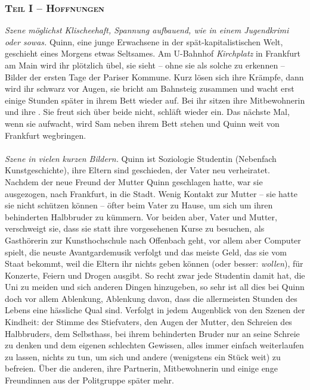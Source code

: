 \subsubsection{\textsc{Teil I -- Hoffnungen}}
\emph{Szene möglichst Klischeehaft, Spannung aufbauend, wie in einem
Jugendkrimi oder sowas.}
Quinn, eine  junge Erwachsene in der
spät-ka\-pi\-ta\-lis\-tischen Welt, geschieht eines Morgens etwas Seltsames.
Am U-Bahnhof \emph{Kirchplatz} in Frankfurt am Main wird ihr plötzlich übel, sie
sieht -- ohne sie als solche zu erkennen -- Bilder der ersten Tage der Pariser
Kommune. 
Kurz lösen sich ihre Krämpfe, dann wird ihr schwarz vor Augen, sie bricht am
Bahnsteig zusammen und wacht erst einige Stunden später in ihrem Bett wieder
auf. 
Bei ihr sitzen ihre Mitbewohnerin und ihre . 
Sie freut sich über beide nicht, schläft wieder ein.
Das nächste Mal, wenn sie aufwacht, wird Sam neben ihrem Bett stehen und Quinn
weit von Frankfurt wegbringen.\\\\
%
\emph{Szene in vielen kurzen Bildern.}
Quinn ist Soziologie Studentin (Nebenfach Kunstgeschichte), ihre Eltern sind
geschieden, der Vater neu verheiratet. 
Nachdem der neue Freund der Mutter Quinn geschlagen hatte, war sie ausgezogen,
nach Frankfurt, in die Stadt. 
Wenig Kontakt zur Mutter -- sie hatte sie nicht schützen können -- öfter beim
Vater zu Hause, um sich um ihren behinderten Halbbruder zu kümmern. 
Vor beiden aber, Vater und Mutter, verschweigt sie, dass sie statt ihre
vorgesehenen Kurse zu besuchen, als Gasthörerin zur Kunsthochschule nach
Offenbach geht, vor allem aber Computer spielt, die neuste Avantgardemusik
verfolgt und das meiste Geld, das sie vom Staat bekommt, weil
die Eltern ihr nichts geben können (oder besser: \emph{wollen}), für Konzerte,
Feiern und Drogen ausgibt. 
So recht zwar jede Studentin damit hat, die Uni zu meiden und sich anderen Dingen
hinzugeben, so sehr ist all dies bei Quinn doch vor allem Ablenkung, Ablenkung
davon, dass die allermeisten Stunden des Lebens eine hässliche Qual sind. 
Verfolgt in jedem Augenblick von den Szenen der Kindheit: der Stimme des
Stiefvaters, den Augen der Mutter, den Schreien des Halbbruders, dem Selbsthass,
bei ihrem behinderten Bruder nur an seine Schreie zu denken und dem eigenen
schlechten Gewissen, alles immer einfach weiterlaufen zu lassen, nichts zu tun,
um sich und andere (wenigstens ein Stück weit) zu befreien. 
Über die anderen, ihre Partnerin, Mitbewohnerin und einige enge Freundinnen
aus der Politgruppe später mehr. 
